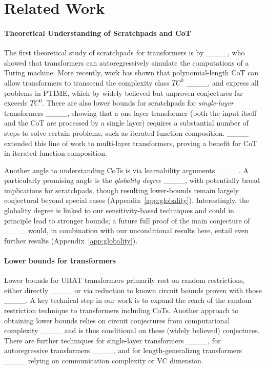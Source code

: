 \section{Related Work}
\paragraph{Theoretical Understanding of Scratchpads and CoT}
The first theoretical study of scratchpads for transformers is by ____, who showed that transformers can autoregressively simulate the computations of a Turing machine. %
More recently, work has shown that polynomial-length CoT can allow transformers to transcend the complexity class $TC^0$ ____, and express all problems in PTIME, which by widely believed but unproven conjectures far exceeds $TC^0$.
There are also lower bounds for scratchpads  for \emph{single-layer} transformers ____, showing that a one-layer transformer (both the input itself and the CoT are processed by a single layer) requires a substantial number of steps to solve certain problems, such as iterated function composition.
____ extended this line of work to multi-layer transformers, proving a benefit for CoT in iterated function composition.



Another angle to understanding CoTs is via learnability arguments ____.
%
A particularly promising angle is the \emph{globality degree} ____, with potentially broad implications for scratchpads, though resulting lower-bounds remain largely conjectural beyond special cases (Appendix~\ref{app:globality}).
Interestingly, the globality degree is linked to our sensitivity-based techniques and could in principle lead to stronger bounds; a future full proof of the main conjecture of ____ would, in combination with our unconditional results here, entail even further results (Appendix~\ref{app:globality}).

%
%
%

\paragraph{Lower bounds for transformers}
Lower bounds for UHAT transformers primarily rest on random restrictions, either directly ____ or via reduction to known circuit bounds proven with those ____.
A key technical step in our work is to expand the reach of the random restriction technique to transformers including CoTs.
%
Another approach to obtaining lower bounds relies on circuit conjectures from computational complexity ____ and is thus conditional on these (widely believed) conjectures.
There are further techniques for single-layer transformers ____, for autoregressive transformers ____, and for length-generalizng transformers ____ relying on communication complexity or VC dimension. 
%

